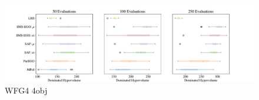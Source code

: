 \documentclass[
dvipsnames, table,   %
format=acmsmall,     %
anonymous=true,      %
authorversion=false, %
]{acmart}
\begin{document}
\begin{figure}[h]
    \centering
    \includegraphics[width=\textwidth]{figures/wfg4_4obj_8dim_hv_boxplot.pdf}
    \caption{WFG4 4obj}
    \label{fig:boxplot WFG4_4obj_8dim}
\end{figure}
\end{document}
